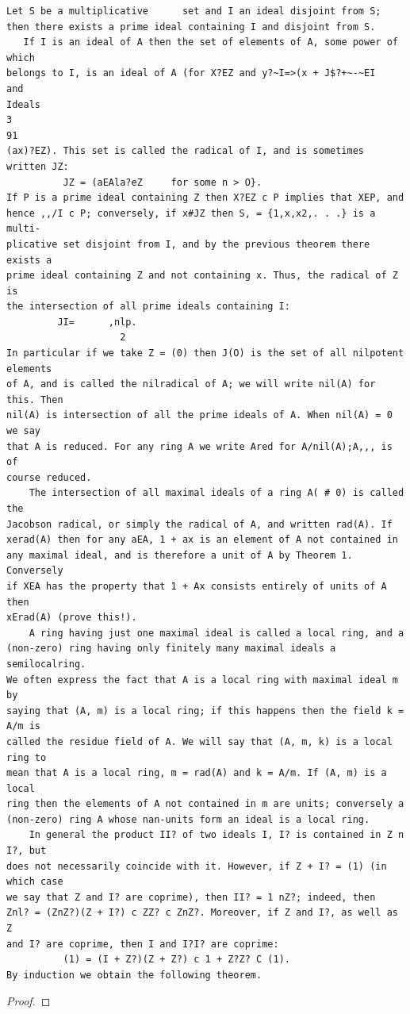 \begin{theorem}\label{mcrt-auto-theorem-1-2}\uses{}
\begin{verbatim}
Let S be a multiplicative      set and I an ideal disjoint from S;
then there exists a prime ideal containing I and disjoint from S.
   If I is an ideal of A then the set of elements of A, some power of which
belongs to I, is an ideal of A (for X?EZ and y?~I=>(x + J$?+~-~EI           and
Ideals                                                                  3
91
(ax)?EZ). This set is called the radical of I, and is sometimes written JZ:
          JZ = (aEAla?eZ     for some n > O}.
If P is a prime ideal containing Z then X?EZ c P implies that XEP, and
hence ,,/I c P; conversely, if x#JZ then S, = {1,x,x2,. . .} is a multi-
plicative set disjoint from I, and by the previous theorem there exists a
prime ideal containing Z and not containing x. Thus, the radical of Z is
the intersection of all prime ideals containing I:
         JI=      ,nlp.
                    2
In particular if we take Z = (0) then J(O) is the set of all nilpotent elements
of A, and is called the nilradical of A; we will write nil(A) for this. Then
nil(A) is intersection of all the prime ideals of A. When nil(A) = 0 we say
that A is reduced. For any ring A we write Ared for A/nil(A);A,,, is of
course reduced.
    The intersection of all maximal ideals of a ring A( # 0) is called the
Jacobson radical, or simply the radical of A, and written rad(A). If
xerad(A) then for any aEA, 1 + ax is an element of A not contained in
any maximal ideal, and is therefore a unit of A by Theorem 1. Conversely
if XEA has the property that 1 + Ax consists entirely of units of A then
xErad(A) (prove this!).
    A ring having just one maximal ideal is called a local ring, and a
(non-zero) ring having only finitely many maximal ideals a semilocalring.
We often express the fact that A is a local ring with maximal ideal m by
saying that (A, m) is a local ring; if this happens then the field k = A/m is
called the residue field of A. We will say that (A, m, k) is a local ring to
mean that A is a local ring, m = rad(A) and k = A/m. If (A, m) is a local
ring then the elements of A not contained in m are units; conversely a
(non-zero) ring A whose nan-units form an ideal is a local ring.
    In general the product II? of two ideals I, I? is contained in Z n I?, but
does not necessarily coincide with it. However, if Z + I? = (1) (in which case
we say that Z and I? are coprime), then II? = 1 nZ?; indeed, then
Znl? = (ZnZ?)(Z + I?) c ZZ? c ZnZ?. Moreover, if Z and I?, as well as Z
and I? are coprime, then I and I?I? are coprime:
          (1) = (I + Z?)(Z + Z?) c 1 + Z?Z? C (1).
By induction we obtain the following theorem.
\end{verbatim}
\end{theorem}
\begin{proof}
\notready
\end{proof}


